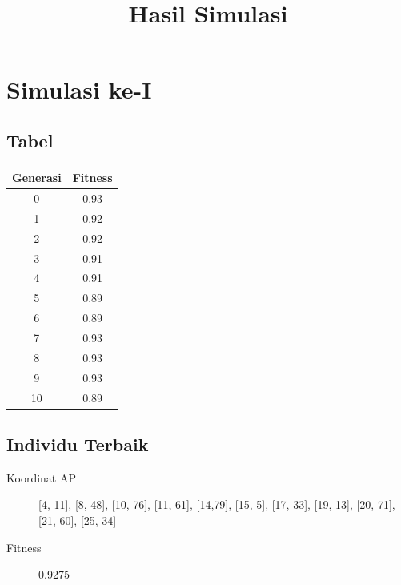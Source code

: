\documentclass[11pt,a4paper,titlepage]{report}
\begin{document}
	\title{Hasil Simulasi}
	\maketitle
	
	\section*{Simulasi ke-I}
	\subsection*{Tabel}
	\begin{tabular}{|c|c|}
		\hline Generasi & Fitness \\ 
		\hline 0 & 0.93 \\ 
		\hline 1 & 0.92 \\ 
		\hline 2 & 0.92 \\ 
		\hline 3 & 0.91 \\ 
		\hline 4 & 0.91 \\ 
		\hline 5 & 0.89 \\ 
		\hline 6 & 0.89 \\ 
		\hline 7 & 0.93 \\ 
		\hline 8 & 0.93 \\ 
		\hline 9 & 0.93 \\ 
		\hline 10 & 0.89 \\
		\hline
	\end{tabular} 
	\subsection*{Individu Terbaik}
	\begin{description}
		\item[Koordinat AP] [4, 11], [8, 48], [10, 76], [11, 61], [14,79], [15, 5], [17, 33], [19, 13], [20, 71], [21, 60], [25, 34]
		\item[Fitness] 0.9275
	\end{description}
	\newpage
\end{document}
